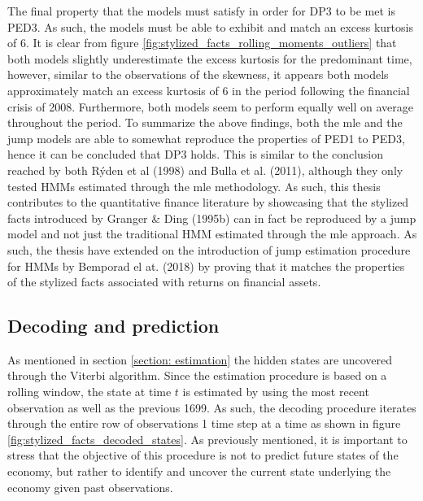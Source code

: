 The final property that the models must satisfy in order for DP3 to be met is PED3. As such, the models must be able to exhibit and match an excess kurtosis of 6. It is clear from figure \ref{fig:stylized_facts_rolling_moments_outliers} that both models slightly underestimate the excess kurtosis for the predominant time, however, similar to the observations of the skewness, it appears both models approximately match an excess kurtosis of 6 in the period following the financial crisis of 2008. Furthermore, both models seem to perform equally well on average throughout the period. To summarize the above findings, both the mle and the jump models are able to somewhat reproduce the properties of PED1 to PED3, hence it can be concluded that DP3 holds. This is similar to the conclusion reached by both Rýden et al (1998) and Bulla et al. (2011), although they only tested HMMs estimated through the mle methodology. As such, this thesis contributes to the quantitative finance literature by showcasing that the stylized facts introduced by Granger \& Ding (1995b) can in fact be reproduced by a jump model and not just the traditional HMM estimated through the mle approach. As such, the thesis have extended on the introduction of jump estimation procedure for HMMs by Bemporad el at. (2018) by proving that it matches the properties of the stylized facts associated with returns on financial assets.

\subsection{Decoding and prediction}
As mentioned in section \ref{section: estimation} the hidden states are uncovered through the Viterbi algorithm. Since the estimation procedure is based on a rolling window, the state at time $t$ is estimated by using the most recent observation as well as the previous 1699. As such, the decoding procedure iterates through the entire row of observations 1 time step at a time as shown in figure \ref{fig:stylized_facts_decoded_states}. As previously mentioned, it is important to stress that the objective of this procedure is not to predict future states of the economy, but rather to identify and uncover the current state underlying the economy given past observations. 

